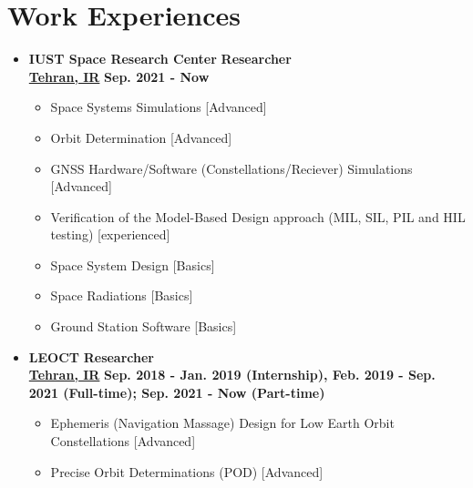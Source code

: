 \documentclass[10pt,a4paper,times]{moderncv}
\begin{document}



\section{Work Experiences}
\begin{itemize}
	\item \textbf{IUST Space Research Center} \hfill \textbf{Researcher} \\
	\href{...}{\textbf{ Tehran, IR}} \hfill \textbf{Sep. 2021 - Now}
	\begin{itemize}
	\item Space Systems Simulations [Advanced]
	\item Orbit Determination [Advanced]
	\item GNSS Hardware/Software (Constellations/Reciever) Simulations [Advanced]
	\item Verification of the Model-Based Design approach (MIL, SIL, PIL and HIL testing) [experienced]
	\item Space System Design [Basics]
	\item Space Radiations [Basics]
	\item Ground Station Software [Basics]
	\end{itemize}
	\item \textbf{LEOCT} \hfill \textbf{Researcher} \\
	\href{...}{\textbf{ Tehran, IR}} \hfill \textbf{Sep. 2018 - Jan. 2019 (Internship), Feb. 2019 - Sep. 2021 (Full-time); Sep. 2021 - Now (Part-time)}
	\begin{itemize}
	\item Ephemeris (Navigation Massage) Design for Low Earth Orbit Constellations [Advanced]
	\item Precise Orbit Determinations (POD) [Advanced]
	\end{itemize}
\end{itemize}
\end{document}
